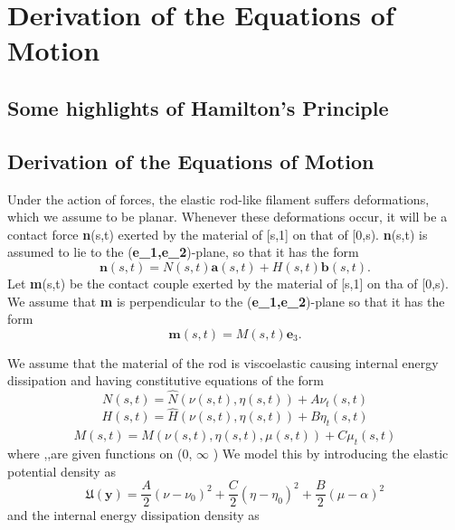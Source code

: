 \documentclass[12pt]{article}
\newcommand{\cB}{B}
\newcommand{\cA}{A}
\newcommand{\cC}{C}
\begin{document}
\section{Derivation of the Equations of Motion
}\label{Derivation of the Equations of Motion
}
\subsection{Some highlights of Hamilton's Principle}
\subsection{Derivation of the Equations of Motion}
Under the action of forces, the elastic rod-like filament suffers deformations, which we assume to be planar. Whenever these deformations occur, it will be a contact force \textbf{n}(s,t) exerted by the material of [s,1] on that of [0,s). \textbf{n}(s,t) is assumed to lie to the (\textbf{e_1,e_2})-plane, so that it has the form
\[  \textbf{n}(s,t)= N(s,t) \textbf{a}(s,t) + H(s,t) \textbf{b} (s,t).
\]
Let \textbf{m}(s,t) be the contact couple exerted by the material of [s,1] on tha of [0,s). We assume that \textbf{m} is perpendicular to the (\textbf{e_1,e_2})-plane so that it has the form
\[ 
\textbf{m}(s,t) = M(s,t)\textbf{e}_3.
\]

We assume that the material of the rod is viscoelastic causing internal energy dissipation and having constitutive equations of the form
\[  N (s,t)=  \hat{N}(\nu (s,t),\eta (s,t)) + A \nu_t (s,t)
\]
\[  H (s,t)=  \hat{H}(\nu (s,t),\eta (s,t)) + B \eta_t (s,t)
\]
\[  M (s,t)=  \hat{M}(\nu (s,t),\eta (s,t), \mu(s,t)) + C \mu_t (s,t)
\]
where ,,are given functions on (0, \(\infty\) ) \times {} \times {}
We model this by introducing the elastic potential density  as
\[ \mathfrak{U}(\textbf{y}) = \frac{\cA}{2} (\nu - \nu_0)^2
+\frac{\cC}{2} (\eta - \eta_0 )^2
+\frac{\cB}{2} (\mu -\alpha)^2 
\]
and the internal energy dissipation density as

\]
\end{document}

